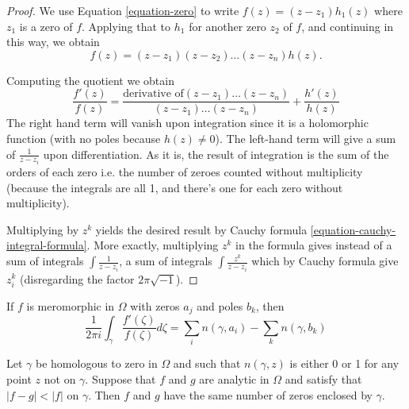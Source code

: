 \begin{proof}
We use Equation \ref{equation-zero} to write
$f(z)=(z-z_1)h_1(z)$ where $z_1$ is a zero of $f$. 
Applying that to $h_1$ for another zero  $z_2$ of $f$,
and continuing in this way, we obtain 
\begin{equation}
\label{equation-factor-zeroes}
f(z)=(z-z_1)(z-z_2)\ldots(z-z_n)h(z).
\end{equation}

\noindent
Computing the quotient we obtain
$$
\frac{f'(z)}{f(z)}=\frac{\text{derivative of
$(z-z_1)\ldots(z-z_n)$}}{(z-z_1)\ldots(z-z_n)}+\frac{h'(z)}{h(z)}
$$
The right hand term will vanish upon integration since it is a holomorphic
function (with no poles because $h(z)\neq 0$). The left-hand term will give a
sum of $\frac{1}{z-z_i}$ upon differentiation. As it is, the result of
integration is the sum of the orders of each zero i.e. the number of zeroes
counted without multiplicity 
(because the integrals are all 1, and there's one for each zero without
multiplicity).

Multiplying by $z^k$ yields the desired result by Cauchy formula
\ref{equation-cauchy-integral-formula}. More exactly,
multiplying $z^k$ in the formula gives instead of a sum
of integrals $\int \frac{1}{z-z_i}$, a sum of integrals
$\int\frac{z^k}{z-z_i}$ which by Cauchy formula give $z_i^k$
(disregarding the factor $2\pi\sqrt{-1}$).
\end{proof}

\begin{theorem}
\label{theorem-argument-principle-and-Rouche-theorem}
\begin{reference}
\cite[Chapter 5, Theorem 18]{ahl}
\end{reference}
If $f$ is meromorphic in $\Omega$ with zeros $a_j$ and poles $b_k$, then
\begin{equation}
\label{equation-argument-principle}
\frac{1}{2\pi i}\int_\gamma\frac{f'(\zeta)}{f(\zeta)}d\zeta
=\sum_{i}n(\gamma,a_i)-\sum_{k}n(\gamma,b_k)
\end{equation}
\end{theorem}

\begin{lemma}
\label{lemma-Rouche-theorem}
\begin{reference}
\cite[Chapter 5, Corollary, p. 153]{ahl}
\end{reference}
Let $\gamma$ be homologous to zero in $\Omega$ and such that $n(\gamma,z)$ is
either 0 or 1 for any point $z$ not on $\gamma$. Suppose that $f$ and $g$ are
analytic in $\Omega$ and satisfy that $|f-g|<|f|$ on $\gamma$. Then $f$ and $g$
have the same number of zeros enclosed by $\gamma$.
\end{lemma}

